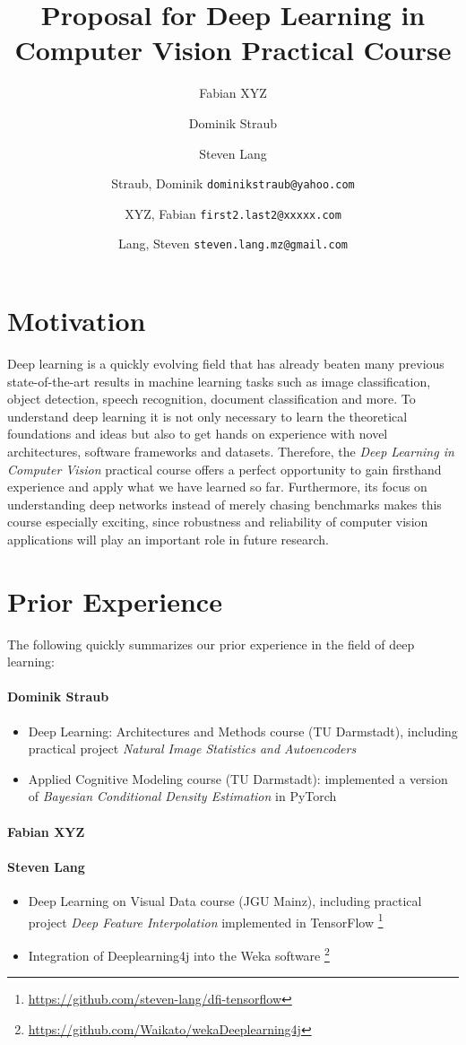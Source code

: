 \documentclass[11pt,english]{article}
\title{Proposal for Deep Learning in Computer Vision Practical Course}
\author{Fabian XYZ}
\author{Dominik Straub}
\author{Steven Lang}
\author{
	Straub, Dominik \texttt{dominikstraub@yahoo.com}
	\and
	XYZ, Fabian \texttt{first2.last2@xxxxx.com}
	\and
	Lang, Steven \texttt{steven.lang.mz@gmail.com}\\
}
\begin{document}
\maketitle
\section{Motivation}
Deep learning is a quickly evolving field that has already beaten many previous state-of-the-art results in machine learning tasks such as image classification, object detection, speech recognition, document classification and more. To understand deep learning it is not only necessary to learn the theoretical foundations and ideas but also to get hands on experience with novel architectures, software frameworks and datasets. Therefore, the \textit{Deep Learning in Computer Vision} practical course offers a perfect opportunity to gain firsthand experience and apply what we have learned so far. Furthermore, its focus on understanding deep networks instead of merely chasing benchmarks makes this course especially exciting, since robustness and reliability of computer vision applications will play an important role in future research.

\section{Prior Experience}
The following quickly summarizes our prior experience in the field of deep learning:

\paragraph{Dominik Straub}
\begin{itemize}
	\setlength\itemsep{-0.25em}
    \item Deep Learning: Architectures and Methods course (TU Darmstadt), including practical project \textit{Natural Image Statistics and Autoencoders}
    \item Applied Cognitive Modeling course (TU Darmstadt): implemented a version of \textit{Bayesian Conditional Density Estimation} \cite{Papamakarios2016} in PyTorch
\end{itemize}
\paragraph{Fabian XYZ}
\paragraph{Steven Lang}
\begin{itemize}
	\setlength\itemsep{-0.25em}
	\item Deep Learning on Visual Data course (JGU Mainz), including practical project \textit{Deep Feature Interpolation} \cite{DBLP:journals/corr/UpchurchGBPSW16} implemented in TensorFlow \footnote{\url{https://github.com/steven-lang/dfi-tensorflow}}
	\item Integration of Deeplearning4j into the Weka software \footnote{\url{https://github.com/Waikato/wekaDeeplearning4j}}
\end{itemize}
\end{document}
